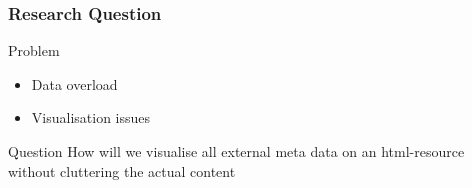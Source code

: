 \begin{frame}
\frametitle{Research Question}
	\begin{block}{Problem}
		\begin{itemize}
			\item Data overload
			\item Visualisation issues
		\end{itemize}
	\end{block}
	\begin{block}{Question}
		How will we visualise all external meta data on an html-resource without cluttering the actual content
	\end{block}

\end{frame}
